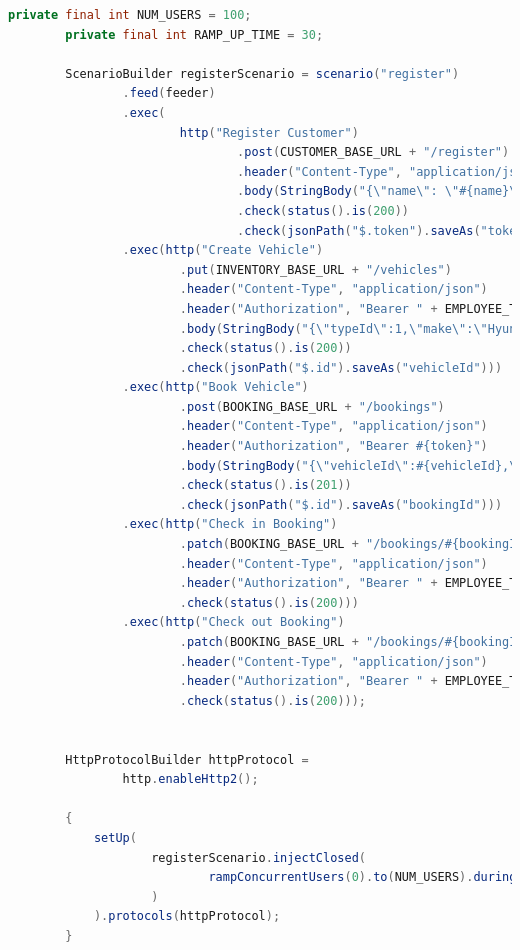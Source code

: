 \begin{codigo}[H]
    \begin{lstlisting}[language=Java]
        private final int NUM_USERS = 100;
        private final int RAMP_UP_TIME = 30;

        ScenarioBuilder registerScenario = scenario("register")
                .feed(feeder)
                .exec(
                        http("Register Customer")
                                .post(CUSTOMER_BASE_URL + "/register")
                                .header("Content-Type", "application/json")
                                .body(StringBody("{\"name\": \"#{name}\", \"email\": \"#{email}\", \"password\": \"#{password}\"}"))
                                .check(status().is(200))
                                .check(jsonPath("$.token").saveAs("token")))
                .exec(http("Create Vehicle")
                        .put(INVENTORY_BASE_URL + "/vehicles")
                        .header("Content-Type", "application/json")
                        .header("Authorization", "Bearer " + EMPLOYEE_TOKEN)
                        .body(StringBody("{\"typeId\":1,\"make\":\"Hyundai\",\"model\":\"Creta\",\"year\":2024,\"mileage\":10000,\"licensePlate\":\"23525\",\"chassisNumber\":\"252355125\",\"engineNumber\":\"234242\",\"color\":\"white\"}"))
                        .check(status().is(200))
                        .check(jsonPath("$.id").saveAs("vehicleId")))
                .exec(http("Book Vehicle")
                        .post(BOOKING_BASE_URL + "/bookings")
                        .header("Content-Type", "application/json")
                        .header("Authorization", "Bearer #{token}")
                        .body(StringBody("{\"vehicleId\":#{vehicleId},\"startTime\":\"2024-12-03T10:15:30\",\"endTime\":\"2024-12-04T10:15:30\"}"))
                        .check(status().is(201))
                        .check(jsonPath("$.id").saveAs("bookingId")))
                .exec(http("Check in Booking")
                        .patch(BOOKING_BASE_URL + "/bookings/#{bookingId}/check-in")
                        .header("Content-Type", "application/json")
                        .header("Authorization", "Bearer " + EMPLOYEE_TOKEN)
                        .check(status().is(200)))
                .exec(http("Check out Booking")
                        .patch(BOOKING_BASE_URL + "/bookings/#{bookingId}/check-out")
                        .header("Content-Type", "application/json")
                        .header("Authorization", "Bearer " + EMPLOYEE_TOKEN)
                        .check(status().is(200)));


        HttpProtocolBuilder httpProtocol =
                http.enableHttp2();

        {
            setUp(
                    registerScenario.injectClosed(
                            rampConcurrentUsers(0).to(NUM_USERS).during(Duration.ofMinutes(RAMP_UP_TIME))
                    )
            ).protocols(httpProtocol);
        }
    \end{lstlisting}
    \caption{Teste de carga}
    \label{cod:test-carga}
\end{codigo}
